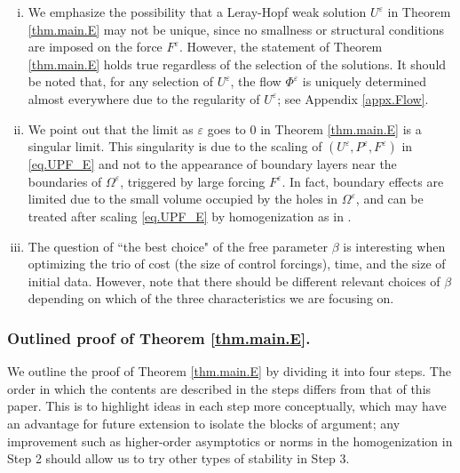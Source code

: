 \documentclass[11pt,a4paper]{article}
\numberwithin{equation}{section}
\newcommand{\eps}{\varepsilon}
\begin{document}
\begin{remark}\label{rem.thm.main.E}
\begin{enumerate}[(i)]
\item\label{item2.rem.thm.main.E}
We emphasize the possibility that a Leray-Hopf weak solution $U^\eps$ in Theorem \ref{thm.main.E} may not be unique, since no smallness or structural conditions are imposed on the force $F^\eps$. However, the statement of Theorem \ref{thm.main.E} holds true regardless of the selection of the solutions. It should be noted that, for any selection of $U^\eps$, the flow $\Phi^\eps$ is uniquely determined almost everywhere due to the regularity of $U^\eps$; see Appendix \ref{appx.Flow}.


\item\label{item3.rem.thm.main.E}
We point out that the limit as $\eps$ goes to $0$ in Theorem \ref{thm.main.E} is a singular limit. This singularity is due to the scaling of $(U^\eps, P^\eps, F^\eps)$ in \eqref{eq.UPF_E} and not to the appearance of boundary layers near the boundaries of $\Omega^\eps$, triggered by large forcing $F^\eps$. In fact, boundary effects are limited due to the small volume occupied by the holes in $\Omega^\eps$, and can be treated after scaling \eqref{eq.UPF_E} by homogenization as in \cite{Hof23}. 



\item\label{item5.rem.thm.main.E}
The question of ``the best choice" of the free parameter $\beta$ is interesting when optimizing the trio of cost (the size of control forcings), time, and the size of initial data. 
However, note that there should be different relevant choices of $\beta$ depending on which of the three characteristics we are focusing on.  
\end{enumerate}
\end{remark}


    \subsubsection*{Outlined proof of Theorem \ref{thm.main.E}.}


We outline the proof of Theorem \ref{thm.main.E} by dividing it into four steps. The order in which the contents are described in the steps differs from that of this paper. This is to highlight ideas in each step more conceptually, which may have an advantage for future extension to isolate the blocks of argument; any improvement such as higher-order asymptotics or norms in the homogenization in Step 2 should allow us to try other types of stability in Step 3. 
\end{document}
